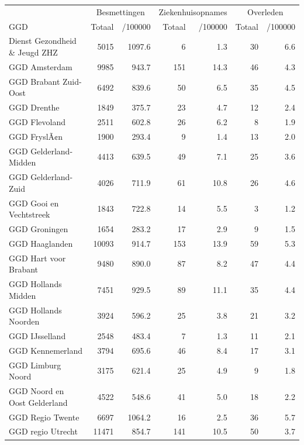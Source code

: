 \documentclass[
  english,
  man,floatsintext]{apa6}
\begin{document}
\begin{table}[H]
\centering\begingroup\fontsize{10}{12}\selectfont

\begin{threeparttable}
\begin{tabular}{lrrrrrr}
\toprule
\multicolumn{1}{c}{ } & \multicolumn{2}{c}{Besmettingen} & \multicolumn{2}{c}{Ziekenhuisopnames} & \multicolumn{2}{c}{Overleden} \\
\cmidrule(l{3pt}r{3pt}){2-3} \cmidrule(l{3pt}r{3pt}){4-5} \cmidrule(l{3pt}r{3pt}){6-7}
GGD & Totaal & /100000 & Totaal & /100000 & Totaal & /100000\\
\midrule
Dienst Gezondheid \& Jeugd ZHZ & 5015 & 1097.6 & 6 & 1.3 & 30 & 6.6\\
GGD Amsterdam & 9985 & 943.7 & 151 & 14.3 & 46 & 4.3\\
GGD Brabant Zuid-Oost & 6492 & 839.6 & 50 & 6.5 & 35 & 4.5\\
GGD Drenthe & 1849 & 375.7 & 23 & 4.7 & 12 & 2.4\\
GGD Flevoland & 2511 & 602.8 & 26 & 6.2 & 8 & 1.9\\
GGD FryslÃ¢n & 1900 & 293.4 & 9 & 1.4 & 13 & 2.0\\
GGD Gelderland-Midden & 4413 & 639.5 & 49 & 7.1 & 25 & 3.6\\
GGD Gelderland-Zuid & 4026 & 711.9 & 61 & 10.8 & 26 & 4.6\\
GGD Gooi en Vechtstreek & 1843 & 722.8 & 14 & 5.5 & 3 & 1.2\\
GGD Groningen & 1654 & 283.2 & 17 & 2.9 & 9 & 1.5\\
GGD Haaglanden & 10093 & 914.7 & 153 & 13.9 & 59 & 5.3\\
GGD Hart voor Brabant & 9480 & 890.0 & 87 & 8.2 & 47 & 4.4\\
GGD Hollands Midden & 7451 & 929.5 & 89 & 11.1 & 35 & 4.4\\
GGD Hollands Noorden & 3924 & 596.2 & 25 & 3.8 & 21 & 3.2\\
GGD IJsselland & 2548 & 483.4 & 7 & 1.3 & 11 & 2.1\\
GGD Kennemerland & 3794 & 695.6 & 46 & 8.4 & 17 & 3.1\\
GGD Limburg Noord & 3175 & 621.4 & 25 & 4.9 & 9 & 1.8\\
GGD Noord en Oost Gelderland & 4522 & 548.6 & 41 & 5.0 & 18 & 2.2\\
GGD Regio Twente & 6697 & 1064.2 & 16 & 2.5 & 36 & 5.7\\
GGD regio Utrecht & 11471 & 854.7 & 141 & 10.5 & 50 & 3.7\\

\end{tabular}
\end{threeparttable}
\end{table}
\end{document}

